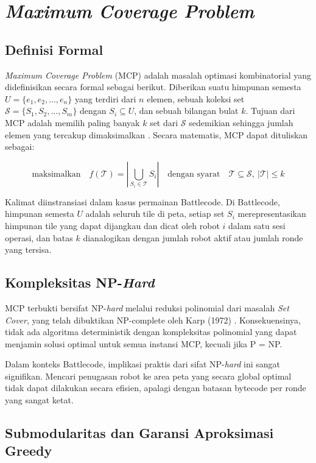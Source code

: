 \section{\textit{Maximum Coverage Problem}}

\subsection{Definisi Formal}

\textit{Maximum Coverage Problem} (MCP) adalah masalah optimasi kombinatorial yang didefinisikan secara formal sebagai berikut. Diberikan suatu himpunan semesta $U = \{e_1, e_2, \ldots, e_n\}$ yang terdiri dari $n$ elemen, sebuah koleksi set $\mathcal{S} = \{S_1, S_2, \ldots, S_m\}$ dengan $S_i \subseteq U$, dan sebuah bilangan bulat $k$. Tujuan dari MCP adalah memilih paling banyak $k$ set dari $\mathcal{S}$ sedemikian sehingga jumlah elemen yang tercakup dimaksimalkan \cite{hochbaum1998analysis}. Secara matematis, MCP dapat dituliskan sebagai:

$$\text{maksimalkan} \quad f(\mathcal{T}) = \left| \bigcup_{S_i \in \mathcal{T}} S_i \right| \quad \text{dengan syarat} \quad \mathcal{T} \subseteq \mathcal{S},\ |\mathcal{T}| \leq k$$

Kalimat diinstransiasi dalam kasus permainan Battlecode. Di Battlecode, himpunan semesta $U$ adalah seluruh tile di peta, setiap set $S_i$ merepresentasikan himpunan tile yang dapat dijangkau dan dicat oleh robot $i$ dalam satu sesi operasi, dan batas $k$ dianalogikan dengan jumlah robot aktif atau jumlah ronde yang tersisa.

\subsection{Kompleksitas NP-\textit{Hard}}

MCP terbukti bersifat NP-\textit{hard} melalui reduksi polinomial dari masalah \textit{Set Cover}, yang telah dibuktikan NP-complete oleh Karp (1972) \cite{cormen2009introduction}. Konsekuensinya, tidak ada algoritma deterministik dengan kompleksitas polinomial yang dapat menjamin solusi optimal untuk semua instansi MCP, kecuali jika P = NP.

Dalam konteks Battlecode, implikasi praktis dari sifat NP-\textit{hard} ini sangat signifikan. Mencari penugasan robot ke area peta yang secara global optimal tidak dapat dilakukan secara efisien, apalagi dengan batasan bytecode per ronde yang sangat ketat.

\subsection{Submodularitas dan Garansi Aproksimasi Greedy}

